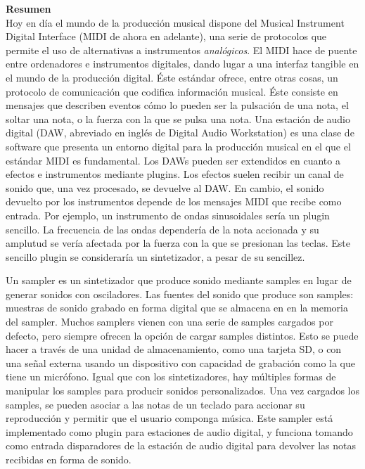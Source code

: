 \documentclass[12pt , a4paper]{article}
\begin{document}
	\newpage
	\huge
	\textbf{Resumen}\\
	
	\normalsize
	Hoy en día el mundo de la producción musical dispone del Musical Instrument Digital Interface (MIDI de ahora en adelante), una serie de protocolos que permite el uso de alternativas a instrumentos \textit{analógicos}. El MIDI hace de puente entre ordenadores e instrumentos digitales, dando lugar a una interfaz tangible en el mundo de la producción digital. Éste estándar ofrece, entre otras cosas, un protocolo de comunicación que codifica información musical. Éste consiste en mensajes que describen eventos cómo lo pueden ser la pulsación de una nota, el soltar una nota, o la fuerza con la que se pulsa una nota. Una estación de audio digital (DAW, abreviado en inglés de Digital Audio Workstation) es una clase de software que presenta un entorno digital para la producción musical en el que el estándar MIDI es fundamental. Los DAWs pueden ser extendidos en cuanto a efectos e instrumentos mediante plugins. Los efectos suelen recibir un canal de sonido que, una vez procesado, se devuelve al DAW. En cambio, el sonido devuelto por los instrumentos depende de los mensajes MIDI que recibe como entrada. Por ejemplo, un instrumento de ondas sinusoidales sería un plugin sencillo. La frecuencia de las ondas dependería de la nota accionada y su amplutud se vería afectada por la fuerza con la que se presionan las teclas. Este sencillo plugin se consideraría un sintetizador, a pesar de su sencillez.

	\par
	Un sampler es un sintetizador que produce sonido mediante samples en lugar de generar sonidos con osciladores. Las fuentes del sonido que produce son samples: muestras de sonido grabado en forma digital que se almacena en en la memoria del sampler. Muchos samplers vienen con una serie de samples cargados por defecto, pero siempre ofrecen la opción de cargar samples distintos. Esto se puede hacer a través de una unidad de almacenamiento, como una tarjeta SD, o con una señal externa usando un dispositivo con capacidad de grabación como la que tiene un micrófono. Igual que con los sintetizadores, hay múltiples formas de manipular los samples para producir sonidos personalizados. Una vez cargados los samples, se pueden asociar a las notas de un teclado para accionar su reproducción y permitir que el usuario componga música. Este sampler está implementado como plugin para estaciones de audio digital, y funciona tomando como entrada disparadores de la estación de audio digital para devolver las notas recibidas en forma de sonido.\\
	
\end{document}
